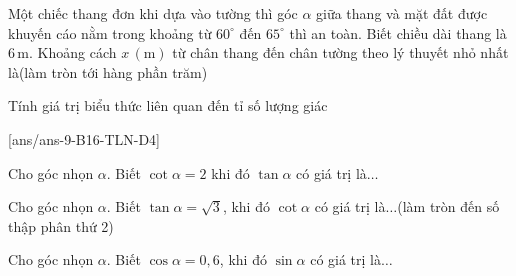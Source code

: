 \begin{ex}%
%
Một chiếc thang đơn khi dựa vào tường thì góc $\alpha$ giữa thang và mặt đất được khuyến cáo nằm trong khoảng từ $60^{\circ}$ đến $65^{\circ}$ thì an toàn. Biết chiều dài thang là $6\,\text{m}$. Khoảng cách $x\,(\text{m})$ từ chân thang đến chân tường theo lý thuyết nhỏ nhất là(làm tròn tới hàng phần trăm)
\end{ex}
\begin{dang}{Tính giá trị biểu thức liên quan đến tỉ số lượng giác}
\end{dang}
[ans/ans-9-B16-TLN-D4]
\begin{ex}%
%
Cho góc nhọn $\alpha$. Biết $\cot \alpha=2$ khi đó $\tan \alpha$ có giá trị là$\ldots$
\end{ex}
\begin{ex}%
	Cho góc nhọn $\alpha$. Biết $\tan \alpha=\sqrt{3}$, khi đó $\cot \alpha$ có giá trị là$\ldots$(làm tròn đến số thập phân thứ 2)
\end{ex}
\begin{ex}%
	Cho góc nhọn $\alpha$. Biết $\cos \alpha = 0{,}6$, khi đó $\sin \alpha$ có giá trị là$\ldots$
\end{ex}

